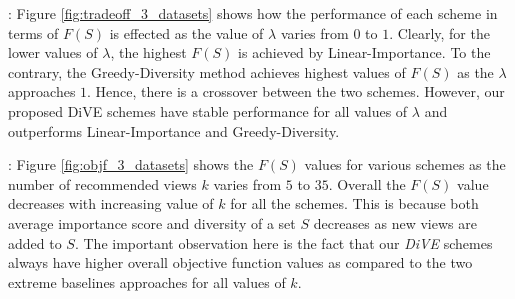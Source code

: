 


{:}
Figure \ref{fig:tradeoff_3_datasets} shows how the performance of each scheme in terms of $F\left(S\right)$ is effected as the value of  $\lambda$ varies from $0$ to $1$. Clearly, for the lower values of $\lambda$, the highest $F(S)$ is achieved by Linear-Importance. To the contrary, the Greedy-Diversity method achieves highest values of $F\left(S\right)$ as the $\lambda$ approaches $1$. 
Hence, there is a crossover between the two schemes. 
However, our proposed DiVE schemes have stable performance for all values of $\lambda$ and outperforms Linear-Importance and Greedy-Diversity. 


{:} 
Figure \ref{fig:objf_3_datasets} shows the $F\left(S\right)$ values for various schemes as the number of recommended views $k$ varies from $5$ to $35$. 
%
Overall the $F\left(S\right)$ value decreases with increasing value of $k$ for all the schemes. 
%
This is because both average importance score and diversity of a set $S$ decreases as new views are added to $S$. 
%
The important observation here is the fact that our {\em DiVE} schemes always have higher overall objective function values as compared to the two extreme baselines approaches for all values of $k$. 




